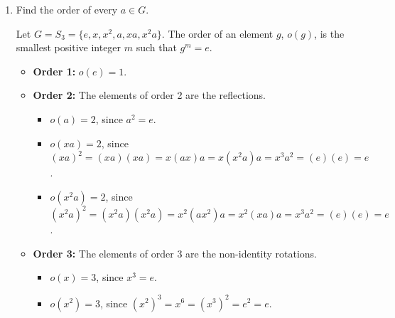 \begin{enumerate}
  
  \newpage
  \begin{enumerate}
    \item Find the order of every $a \in G$.
    \begin{subanswer}
      Let $G = S_3 = \{e, x, x^2, a, xa, x^2a\}$. The order of an element $g$, $o(g)$, is the smallest positive integer $m$ such that $g^m = e$.
      \begin{itemize}
        \item \textbf{Order 1:} $o(e) = 1$.
        \item \textbf{Order 2:} The elements of order 2 are the reflections.
        \begin{itemize}
          \item $o(a) = 2$, since $a^2 = e$.
          \item $o(xa) = 2$, since $(xa)^2 = (xa)(xa) = x(ax)a = x(x^2a)a = x^3a^2 = (e)(e) = e$.
          \item $o(x^2a) = 2$, since $(x^2a)^2 = (x^2a)(x^2a) = x^2(ax^2)a = x^2(xa)a = x^3a^2 = (e)(e) = e$.
        \end{itemize}
        \item \textbf{Order 3:} The elements of order 3 are the non-identity rotations.
        \begin{itemize}
          \item $o(x) = 3$, since $x^3 = e$.
          \item $o(x^2) = 3$, since $(x^2)^3 = x^6 = (x^3)^2 = e^2 = e$.
        \end{itemize}
      \end{itemize}
    \end{subanswer}


\end{enumerate}
\end{enumerate}
